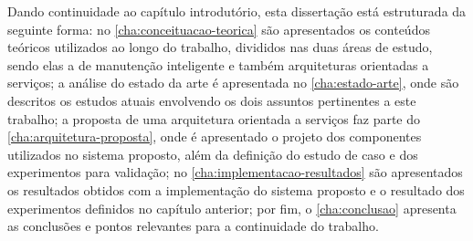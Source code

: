 
Dando continuidade ao capítulo introdutório, esta dissertação está estruturada da seguinte forma: no
\cref{cha:conceituacao-teorica} são apresentados os conteúdos teóricos utilizados ao longo do
trabalho, divididos nas duas áreas de estudo, sendo elas a de manutenção inteligente e também
arquiteturas orientadas a serviços; a análise do estado da arte é apresentada no
\cref{cha:estado-arte}, onde são descritos os estudos atuais envolvendo os dois assuntos
pertinentes a este trabalho; a proposta de uma arquitetura orientada a serviços faz parte do
\cref{cha:arquitetura-proposta}, onde é apresentado o projeto dos componentes utilizados no sistema
proposto, além da definição do estudo de caso e dos experimentos para validação; no
\cref{cha:implementacao-resultados} são apresentados os resultados obtidos com a implementação do
sistema proposto e o resultado dos experimentos definidos no capítulo anterior; por fim, o
\cref{cha:conclusao} apresenta as conclusões e pontos relevantes para a continuidade do trabalho.
